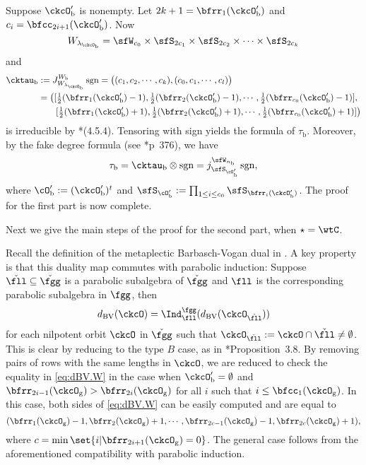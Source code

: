 \documentclass[12pt]{amsart}
\def\subset{\subseteq}
\newcommand{\sgn}{\operatorname{sgn}}
\numberwithin{equation}{section}
\theoremstyle{remark}
\def\half{{\tfrac{1}{2}}}
\def\dBV{d_{\mathrm{BV}}}
\def\lamckb{\lambda_{\ckcO_{\mathrm b}}}
\def\Wb{W_{\mathrm b}}
\def\ckfgg{{\check \fgg}}
\def\ckcOpb{\ckcO'_{\mathrm b}}
\def\cOpb{\cO'_{\mathrm b}}
\def\ckcOg{\ckcO_{\mathrm g}}
\begin{document}
{    Suppose $\ckcOpb$ is nonempty.
    Let $2k+1=\bfrr_{1}(\ckcOpb)$ and $c_{i} = \bfcc_{2i+1}(\ckcOpb)$.
    Now
    \[
      W_{\lamckb} = \sfW_{c_{0}} \times \sfS_{2c_{1}} \times \sfS_{2c_{2}}\times \cdots \times \sfS_{2c_{k}}
    \]
    and %
    \[
      \begin{split}
        \cktau_{\mathrm b} &:= J_{W_{\lamckb}}^{\Wb} \sgn
        = \big((c_{1},c_{2},\cdots, c_{k}),(c_{0},c_{1}, \cdots, c_{l})\big)\\
        & = \big([\half(\bfrr_{1}(\ckcOpb)-1),\half(\bfrr_{2}(\ckcOpb)-1),\cdots, \half(\bfrr_{c_{0}}(\ckcOpb)-1)],\\
        & \hspace{2em} [\half(\bfrr_{1}(\ckcOpb)+1),\half(\bfrr_{2}(\ckcOpb)+1),\cdots, \half(\bfrr_{c_{0}}(\ckcOpb)+1)]\big)
      \end{split}
    \]
    is irreducible by \cite{Lu}*{(4.5.4)}. Tensoring with sign yields the
    formula of $\tau_{\mathrm b}$. Moreover, by the fake degree formula (see
    \cite{Carter}*{p~376}), we have
    \[
      \tau_{\mathrm b} = \cktau_{\mathrm b}\otimes \sgn = j_{\sfS_{\cO'_{\mathrm b}}}^{\sfW_{n_{\mathrm b}}} \sgn,
    \]
    where
    $ \cOpb:= (\ckcOpb)^{t}$
    and $\sfS_{\cOpb} := \prod_{1\leq i\leq c_{0}}\sfS_{\bfrr_{i}(\ckcOpb)}$. The proof for the first part is now complete.

    \medskip \def\ckfll{\check{\fll}}

    Next we give the main steps of the proof for the second part, when $\star = \wtC$.

    Recall the definition of the metaplectic Barbasch-Vogan dual in
    \cite{BMSZ1}. A key property is that this duality map commutes with parabolic induction: Suppose
    $\ckfll\subset \ckfgg$ is a parabolic subalgebra of $\ckfgg$ and
    $\fll$ is the corresponding parabolic subalgebra in $\fgg$, then
    \begin{equation*}%
      \dBV(\ckcO) =  \Ind_{\fll}^{\fgg}(\dBV(\ckcO_{\ckfll}))
    \end{equation*}
    for each nilpotent orbit $\ckcO$ in $\ckfgg$ such that
    $\ckcO_{\ckfll}:=\ckcO\cap \ckfll\neq \emptyset$. This is clear by reducing
    to the type $B$ case, as in \cite{BMSZ1}*{Proposition~3.8}. By removing pairs
    of rows with the same lengths in $\ckcO$, we are reduced to check the equality in \eqref{eq:dBV.W}
    in the case when $\ckcOpb=\emptyset$ and
    $\bfrr_{2i-1}(\ckcO_{\mathrm g})>\bfrr_{2i}(\ckcO_{\mathrm g})$ for all $i$ such that
    $i\leq \bfcc_{1}(\ckcO_{\mathrm g})$. In this case, both sides of \eqref{eq:dBV.W}
    can be easily computed and are equal to
    \[
      (\bfrr_{1}(\ckcOg)-1, \bfrr_{2}(\ckcOg)+1, \cdots,\bfrr_{2c-1}(\ckcOg)-1,\bfrr_{2c}(\ckcOg)+1),
    \]
    where $c = \min\set{i|\bfrr_{2i+1}(\ckcOg)=0}$. The general case follows
    from the aforementioned compatibility with parabolic induction.
    }
\end{document}
